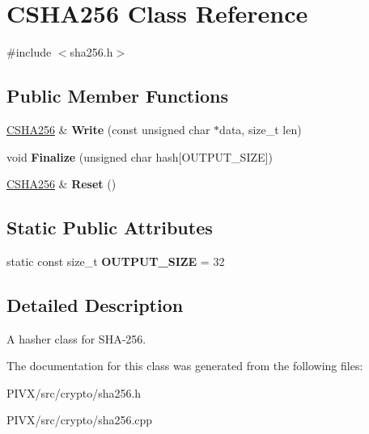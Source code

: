 \hypertarget{class_c_s_h_a256}{}\section{C\+S\+H\+A256 Class Reference}
\label{class_c_s_h_a256}


{\ttfamily \#include $<$sha256.\+h$>$}

\subsection*{Public Member Functions}
\begin{DoxyCompactItemize}
\item 
\mbox{\label{class_c_s_h_a256_a9d7de520a562655da85349372820c883}} 
\mbox{\hyperlink{class_c_s_h_a256}{C\+S\+H\+A256}} \& {\bfseries Write} (const unsigned char $\ast$data, size\+\_\+t len)
\item 
\mbox{\label{class_c_s_h_a256_a4259230be0caefa590bc324fc12b9b90}} 
void {\bfseries Finalize} (unsigned char hash\mbox{[}O\+U\+T\+P\+U\+T\+\_\+\+S\+I\+ZE\mbox{]})
\item 
\mbox{\label{class_c_s_h_a256_a2122395dd5604990eaa0077b43a0e8d4}} 
\mbox{\hyperlink{class_c_s_h_a256}{C\+S\+H\+A256}} \& {\bfseries Reset} ()
\end{DoxyCompactItemize}
\subsection*{Static Public Attributes}
\begin{DoxyCompactItemize}
\item 
\mbox{\label{class_c_s_h_a256_a3d7ef512c0ceb0008396e62f5c4771fc}} 
static const size\+\_\+t {\bfseries O\+U\+T\+P\+U\+T\+\_\+\+S\+I\+ZE} = 32
\end{DoxyCompactItemize}


\subsection{Detailed Description}
A hasher class for S\+H\+A-\/256. 

The documentation for this class was generated from the following files\+:\begin{DoxyCompactItemize}
\item 
P\+I\+V\+X/src/crypto/sha256.\+h\item 
P\+I\+V\+X/src/crypto/sha256.\+cpp\end{DoxyCompactItemize}
